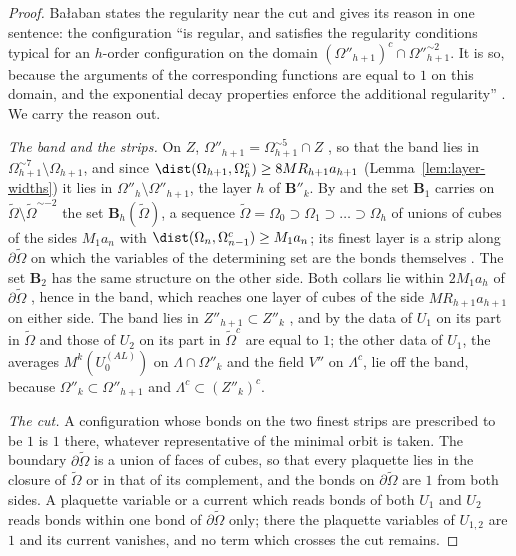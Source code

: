 \begin{proof}
Ba{\l}aban states the regularity near the cut and gives its reason in one sentence: the configuration ``is regular, and satisfies the regularity conditions typical for an $h$-order configuration on the domain $(\Omega''_{h+1})^c \cap \Omega''^{\sim2}_{h+1}$. It is so, because the arguments of the corresponding functions are equal to $1$ on this domain, and the exponential decay properties enforce the additional regularity'' \cite[p.~370, ll.~35--38]{BalabanLFR2}. We carry the reason out.

\emph{The band and the strips.} On $Z$, $\Omega''_{h+1} = \Omega^{\sim5}_{h+1} \cap Z$ \cite[(1.11), (1.12), p.~179]{BalabanLFR1}, so that the band lies in $\Omega^{\sim7}_{h+1} \setminus \Omega_{h+1}$, and since $\dist(\Omega_{h+1}, \Omega_h^c) \geq 8MR_{h+1}a_{h+1}$ (Lemma~\ref{lem:layer-widths}) it lies in $\Omega''_h \setminus \Omega''_{h+1}$, the layer $h$ of $\mathbf B''_k$. By \cite[(1.52)]{BalabanLFR2} and \cite[(2.14)]{BalabanCRE} the set $\mathbf B_1$ carries on $\tilde\Omega \setminus \tilde\Omega^{\sim-2}$ the set $\mathbf B_h(\tilde\Omega)$, a sequence $\tilde\Omega = \Omega_0 \supset \Omega_1 \supset \dots \supset \Omega_h$ of unions of cubes of the sides $M_1a_n$ with $\dist(\Omega_n, \Omega_{n-1}^c) \geq M_1a_n$; its finest layer is a strip along $\partial\tilde\Omega$ on which the variables of the determining set are the bonds themselves \cite[(3), (4), p.~278]{BalabanVAR}. The set $\mathbf B_2$ has the same structure on the other side. Both collars lie within $2M_1a_h$ of $\partial\tilde\Omega$ \cite[p.~256, l.~62]{BalabanCRE}, hence in the band, which reaches one layer of cubes of the side $MR_{h+1}a_{h+1}$ on either side. The band lies in $Z''_{h+1} \subset Z''_k$ \cite[p.~195, l.~42]{BalabanLFR1}, and by \cite[(1.53)]{BalabanLFR2} the data of $U_1$ on its part in $\tilde\Omega$ and those of $U_2$ on its part in $\tilde\Omega^c$ are equal to $1$; the other data of $U_1$, the averages $M^k(U^{(AL)}_0)$ on $\Lambda \cap \Omega''_k$ and the field $V''$ on $\Lambda^c$, lie off the band, because $\Omega''_k \subset \Omega''_{h+1}$ and $\Lambda^c \subset (Z''_k)^c$.

\emph{The cut.} A configuration whose bonds on the two finest strips are prescribed to be $1$ is $1$ there, whatever representative of the minimal orbit is taken. The boundary $\partial\tilde\Omega$ is a union of faces of cubes, so that every plaquette lies in the closure of $\tilde\Omega$ or in that of its complement, and the bonds on $\partial\tilde\Omega$ are $1$ from both sides. A plaquette variable or a current which reads bonds of both $U_1$ and $U_2$ reads bonds within one bond of $\partial\tilde\Omega$ only; there the plaquette variables of $U_{1,2}$ are $1$ and its current vanishes, and no term which crosses the cut remains.


\end{proof}

